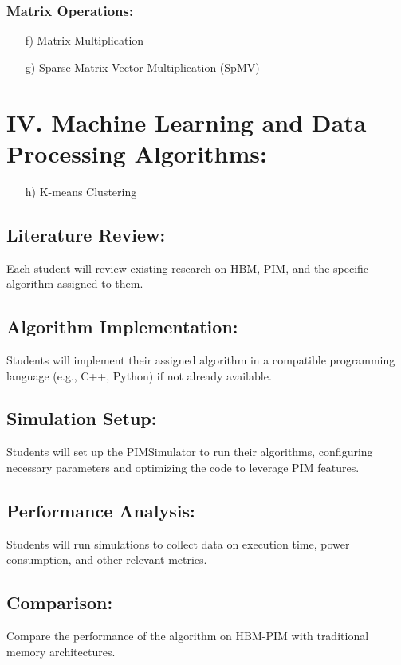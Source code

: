 \documentclass[12pt]{article}
\begin{document}
\subsubsection{Matrix Operations:}
\begin{enumerate}
	\item[f)] Matrix Multiplication
	\item[g)] Sparse Matrix-Vector Multiplication (SpMV)
\end{enumerate}

\section*{IV. Machine Learning and Data Processing Algorithms:}
\begin{enumerate}
	\item[h)] K-means Clustering
\end{enumerate}


\subsection{Literature Review:}
Each student will review existing research on HBM, PIM, and the specific algorithm assigned to them.


\subsection{Algorithm Implementation:}
Students will implement their assigned algorithm in a compatible programming language (e.g., C++, Python) if not already available.

\subsection{Simulation Setup:}
Students will set up the PIMSimulator to run their algorithms, configuring necessary parameters and optimizing the code to leverage PIM features.

\subsection{Performance Analysis:}
Students will run simulations to collect data on execution time, power consumption, and other relevant metrics.

\subsection{Comparison:}
Compare the performance of the algorithm on HBM-PIM with traditional memory architectures.
\end{document}
